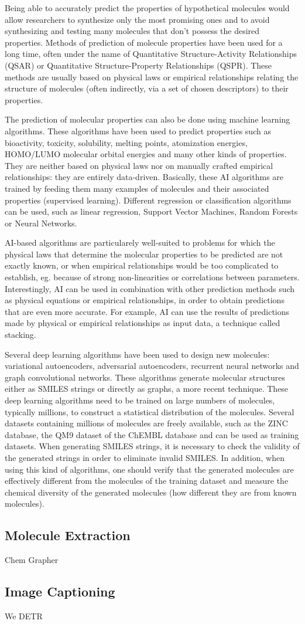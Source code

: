 Being able to accurately predict the properties of hypothetical molecules would allow researchers to synthesize only the most promising ones and to avoid synthesizing and testing many molecules that don't possess the desired properties. Methods of prediction of molecule properties have been used for a long time, often under the name of Quantitative Structure-Activity Relationships (QSAR) or Quantitative Structure-Property Relationships (QSPR). These methods are usually based on physical laws or empirical relationships relating the structure of molecules (often indirectly, via a set of chosen descriptors) to their properties.

The prediction of molecular properties can also be done using machine learning algorithms. These algorithms have been used to predict properties such as bioactivity, toxicity, solubility, melting points, atomization energies, HOMO/LUMO molecular orbital energies and many other kinds of properties. They are neither based on physical laws nor on manually crafted empirical relationships: they are entirely data-driven. Basically, these AI algorithms are trained by feeding them many examples of molecules and their associated properties (supervised learning). Different regression or classification algorithms can be used, such as linear regression, Support Vector Machines, Random Forests or Neural Networks.

AI-based algorithms are particularely well-suited to problems for which the physical laws that determine the molecular properties to be predicted are not exactly known, or when empirical relationships would be too complicated to establish, eg. because of strong non-linearities or correlations between parameters. Interestingly, AI can be used in combination with other prediction methods such as physical equations or empirical relationships, in order to obtain predictions that are even more accurate. For example, AI can use the results of predictions made by physical or empirical relationships as input data, a technique called stacking.

Several deep learning algorithms have been used to design new molecules: variational autoencoders, adversarial autoencoders, recurrent neural networks and graph convolutional networks. These algorithms generate molecular structures either as SMILES strings or directly as graphs, a more recent technique. These deep learning algorithms need to be trained on large numbers of molecules, typically millions, to construct a statistical distribution of the molecules. Several datasets containing millions of molecules are freely available, such as the ZINC database, the QM9 dataset of the ChEMBL database and can be used as training datasets. When generating SMILES strings, it is necessary to check the validity of the generated strings in order to eliminate invalid SMILES. In addition, when using this kind of algorithms, one should verify that the generated molecules are effectively different from the molecules of the training dataset and measure the chemical diversity of the generated molecules (how different they are from known molecules).
\subsection{Molecule Extraction}
Chem Grapher\cite{Oldenhof2020ChemGrapherOG} 
\subsection{Image Captioning}


We DETR \cite{Carion2020EndtoEndOD}

